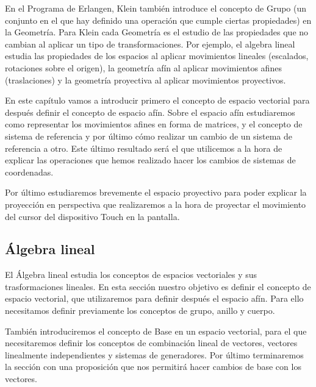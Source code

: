 \documentclass[a4paper,11pt, oneside]{book}
\begin{document}
En el Programa de Erlangen, Klein también introduce el concepto de Grupo (un conjunto en el que hay definido una operación que cumple ciertas propiedades) en la Geometría. Para Klein cada Geometría es el estudio de las propiedades que no cambian al aplicar un tipo de transformaciones. Por ejemplo, el algebra lineal estudia las propiedades de los espacios al aplicar movimientos lineales (escalados, rotaciones sobre el origen), la geometría afín al aplicar movimientos afines (traslaciones) y la geometría proyectiva al aplicar movimientos proyectivos.

En este capítulo vamos a introducir primero el concepto de espacio vectorial para después definir el concepto de espacio afín. Sobre el espacio afín estudiaremos como representar los movimientos afines en forma de matrices, y el concepto de sistema de referencia y por último cómo realizar un cambio de un sistema de referencia a otro. Este último resultado será el que utilicemos a la hora de explicar las operaciones que hemos realizado hacer los cambios de sistemas de coordenadas.

Por último estudiaremos brevemente el espacio proyectivo para poder explicar la proyección en perspectiva que realizaremos a la hora de proyectar el movimiento del cursor del dispositivo Touch en la pantalla.

 


\subsection{Álgebra lineal}

El Álgebra lineal estudia los conceptos de espacios vectoriales y sus trasformaciones lineales. En esta sección nuestro objetivo es definir el concepto de espacio vectorial, que utilizaremos para definir después el espacio afín. Para ello necesitamos definir previamente los conceptos de grupo, anillo y cuerpo. 

También introduciremos el concepto de Base en un espacio vectorial, para el que necesitaremos definir los conceptos de combinación lineal de vectores, vectores linealmente independientes y sistemas de generadores. Por último terminaremos la sección con una proposición que nos permitirá hacer cambios de base con los vectores.
\end{document}
